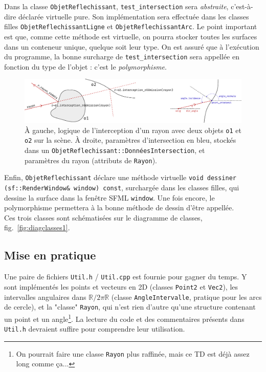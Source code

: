 \documentclass{book}
\newcommand{\inline}[1]{\texttt{#1}}
\def\filename{\texttt}
\begin{document}
Dans la classe \texttt{ObjetReflechissant}, \inline{test_intersection} sera \emph{abstraite}, c'est-à-dire déclarée virtuelle pure. Son implémentation sera effectuée dans les classes filles \texttt{ObjetReflechissantLigne} et \texttt{ObjetReflechissantArc}. Le point important est que, comme cette méthode est virtuelle, on pourra stocker toutes les surfaces dans un conteneur unique, quelque soit leur type. On est assuré que à l'exécution du programme, la bonne surcharge de \inline{test_intersection} sera appellée en fonction du type de l'objet : c'est le \emph{polymorphisme}.\\

\begin{figure}[H]
  \includegraphics[width=\textwidth]{TD5/intercept-reemit.pdf}
  \caption{À gauche, logique de l'interception d'un rayon avec deux objets \texttt{o1} et \texttt{o2} sur la scène. À droite, paramètres d'intersection en bleu, stockés dans un \inline{ObjetReflechissant::DonnéesIntersection}, et paramètres du rayon (attributs de \inline{Rayon}).}
  \label{fig:intercept-reemit}
\end{figure}

Enfin, \texttt{ObjetReflechissant} déclare une méthode virtuelle \inline{void dessiner (sf::RenderWindow& window) const}, surchargée dans les classes filles, qui dessine la surface dans la fenêtre SFML \inline{window}. Une fois encore, le polymorphisme permettera à la bonne méthode de dessin d'être appellée.\\

Ces trois classes sont schématisées sur le diagramme de classes, fig.\ \ref{fig:diagclasses1}. 

\subsection{Mise en pratique}

Une paire de fichiers \filename{Util.h} / \filename{Util.cpp} est fournie pour gagner du temps. Y sont implémentés les points et vecteurs en 2D (classes \inline{Point2} et \inline{Vec2}), les intervalles angulaires dans $\mathbb{R}/2\pi\mathbb{R}$ (classe \inline{AngleIntervalle}, pratique pour les arcs de cercle), et la "classe" \inline{Rayon}, qui n'est rien d'autre qu'une structure contenant un point et un angle\footnote{On pourrait faire une classe \inline{Rayon} plus raffinée, mais ce TD est déjà assez long comme ça...}. La lecture du code et des commentaires présents dans \filename{Util.h} devraient suffire pour comprendre leur utilisation.\\
\end{document}
